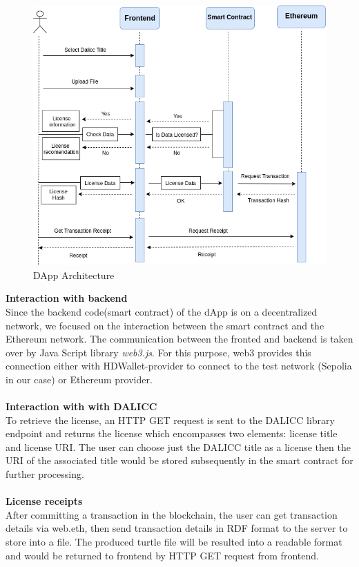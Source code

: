  \begin{center}
 	
 	\begin{figure}[htb!]
 		
 		\begin{minipage}{0.75\linewidth}
 			
 			\includegraphics[width=1.45\textwidth]{images/chap03_user_roadmap.png}
 		\end{minipage}
 		\caption{DApp Architecture}
  	\end{figure}
  \end{center}
 \textbf{Interaction with backend}\\
 Since the backend code(smart contract) of the dApp is on a decentralized network, we focused on the interaction between the smart contract and the Ethereum network. The communication between the fronted and backend is taken over by Java Script library \textit{web3.js}.
 For this purpose, web3 provides this connection either with HDWallet-provider to connect to the test network (Sepolia in our case) or Ethereum provider.\\
 \\
 \textbf{Interaction with with DALICC} \\
 To retrieve the license, an HTTP GET request is sent to the DALICC library endpoint and returns the license which encompasses two elements: license title and license URI. The user can choose just the DALICC title as a license then the URI of the associated title would be stored subsequently in the smart contract for further processing. \\
 \\
\textbf{License receipts}\\
After committing a transaction in the blockchain, the user can get transaction details via web.eth, then send transaction details in RDF format to the server to store into a file. The produced turtle file will be resulted into a readable format and would be returned to frontend by HTTP GET request from frontend.
\\

